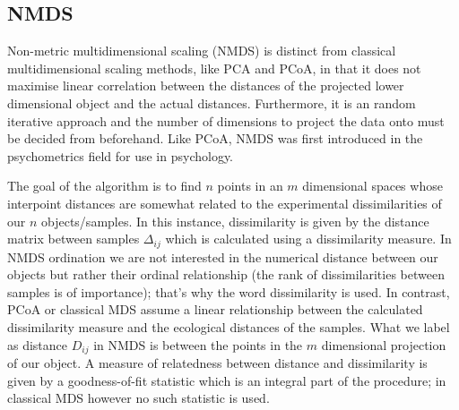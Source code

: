 \subsection{NMDS}
Non-metric multidimensional scaling (NMDS) is distinct from classical multidimensional scaling methods, like PCA and PCoA, in that it does not maximise linear correlation between the distances of the projected lower dimensional object and the actual distances. Furthermore, it is an random iterative approach and the number of dimensions to project the data onto must be decided from beforehand. Like PCoA, NMDS was first introduced in the psychometrics field for use in psychology.

The goal of the algorithm is to find $n$ points in an $m$ dimensional spaces whose interpoint distances are somewhat related to the experimental dissimilarities of our $n$ objects/samples. In this instance, dissimilarity is given by the distance matrix between samples $\Delta_{ij}$ which is calculated using a dissimilarity measure. In NMDS ordination we are not interested in the numerical distance between our objects but rather their ordinal relationship (the rank of dissimilarities between samples is of importance); that's why the word dissimilarity is used. In contrast, PCoA or classical MDS assume a linear relationship between the calculated dissimilarity measure and the ecological distances of the samples. What we label as distance ${D}_{ij}$ in NMDS is between the points in the $m$ dimensional projection of our object. A measure of relatedness between distance and dissimilarity is given by a goodness-of-fit statistic which is an integral part of the procedure; in classical MDS however no such statistic is used.

